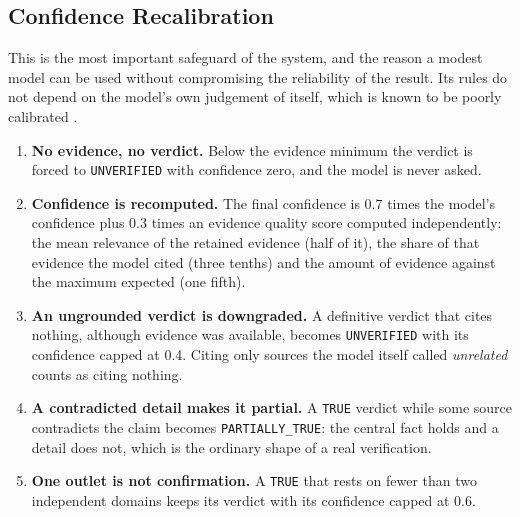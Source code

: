 
\subsection{Confidence Recalibration}
\label{subsec:recalibration}

This is the most important safeguard of the system, and the reason a
modest model can be used without compromising the reliability of the
result. Its rules do not depend on the model's own judgement of itself,
which is known to be poorly calibrated \cite{guo2017calibration}.

\begin{enumerate}
    \item \textbf{No evidence, no verdict.} Below the evidence minimum
    the verdict is forced to \texttt{UNVERIFIED} with confidence zero,
    and the model is never asked.
    \item \textbf{Confidence is recomputed.} The final confidence is
    $0.7$ times the model's confidence plus $0.3$ times an evidence
    quality score computed independently: the mean relevance of the
    retained evidence (half of it), the share of that evidence the model
    cited (three tenths) and the amount of evidence against the maximum
    expected (one fifth).
    \item \textbf{An ungrounded verdict is downgraded.} A definitive
    verdict that cites nothing, although evidence was available, becomes
    \texttt{UNVERIFIED} with its confidence capped at 0.4. Citing only
    sources the model itself called \emph{unrelated} counts as citing
    nothing.
    \item \textbf{A contradicted detail makes it partial.} A
    \texttt{TRUE} verdict while some source contradicts the claim
    becomes \texttt{PARTIALLY\_TRUE}: the central fact holds and a
    detail does not, which is the ordinary shape of a real verification.
    \item \textbf{One outlet is not confirmation.} A \texttt{TRUE} that
    rests on fewer than two independent domains keeps its verdict with
    its confidence capped at 0.6.
\end{enumerate}

